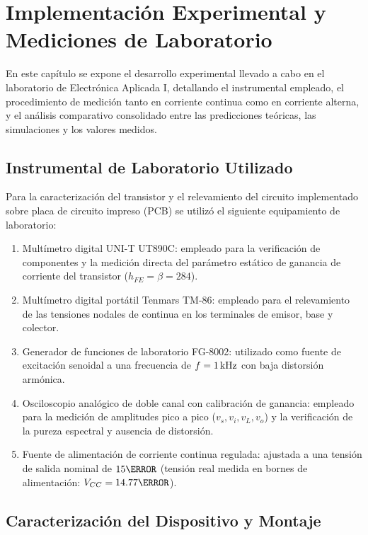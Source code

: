 \chapter{Implementación Experimental y Mediciones de Laboratorio}
\label{chap:mediciones_laboratorio}

En este capítulo se expone el desarrollo experimental llevado a cabo en el laboratorio de Electrónica Aplicada I,
detallando el instrumental empleado, el procedimiento de medición tanto en corriente continua como en corriente
alterna, y el análisis comparativo consolidado entre las predicciones teóricas, las simulaciones y los valores medidos.

\section{Instrumental de Laboratorio Utilizado}

Para la caracterización del transistor y el relevamiento del circuito implementado sobre placa de circuito impreso (PCB)
se utilizó el siguiente equipamiento de laboratorio:
\begin{enumerate}
  \item Multímetro digital UNI-T UT890C: empleado para la verificación de componentes y la medición directa del
    parámetro estático de ganancia de corriente del transistor ($h_{FE} = \beta = 284$).
  \item Multímetro digital portátil Tenmars TM-86: empleado para el relevamiento de las tensiones nodales de continua en
    los terminales de emisor, base y colector.
  \item Generador de funciones de laboratorio FG-8002: utilizado como fuente de excitación senoidal a una frecuencia de
    $f = 1\,\mathrm{kHz}$ con baja distorsión armónica.
  \item Osciloscopio analógico de doble canal con calibración de ganancia: empleado para la medición de amplitudes pico
    a pico ($v_s, v_i, v_L, v_o$) y la verificación de la pureza espectral y ausencia de distorsión.
  \item Fuente de alimentación de corriente continua regulada: ajustada a una tensión de salida nominal de $15\V$
    (tensión real medida en bornes de alimentación: $V_{CC} = 14.77\V$).
\end{enumerate}

\section{Caracterización del Dispositivo y Montaje}

